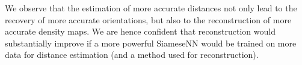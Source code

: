 We observe that the estimation of more accurate distances not only lead to the recovery of more accurate orientations, but also to the reconstruction of more accurate density maps.
We are hence confident that reconstruction would substantially improve if a more powerful SiameseNN would be trained on more data for distance estimation (and a  method used for reconstruction).
